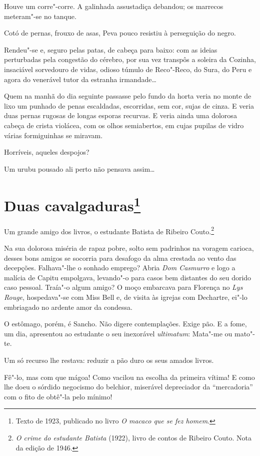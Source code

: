 Houve um corre"-corre. A galinhada assustadiça debandou; os marrecos
meteram"-se no tanque.

Cotó de pernas, frouxo de asas, Peva pouco resistiu à perseguição do
negro.

Rendeu"-se e, seguro pelas patas, de cabeça para baixo: com as ideias
perturbadas pela congestão do cérebro, por sua vez transpôs a soleira da
Cozinha, insaciável sorvedouro de vidas, odioso túmulo de Reco"-Reco, do
Sura, do Peru e agora do venerável tutor da estranha irmandade\ldots{}

Quem na manhã do dia seguinte passasse pelo fundo da horta veria no
monte de lixo um punhado de penas escaldadas, escorridas, sem cor, sujas
de cinza. E veria duas pernas rugosas de longas esporas recurvas. E
veria ainda uma dolorosa cabeça de crista violácea, com os olhos
semiabertos, em cujas pupilas de vidro várias formiguinhas se miravam.

Horríveis, aqueles despojos?

Um urubu pousado ali perto não pensava assim\ldots{}

\chapter{Duas cavalgaduras\footnote[*]{Texto de 1923, publicado no livro \emph{O macaco que se fez homem}.}}

Um grande amigo dos livros, o estudante Batista de Ribeiro
Couto.\footnote{\emph{O crime do estudante Batista} (1922), livro de
  contos de Ribeiro Couto. Nota da edição de 1946.}

Na sua dolorosa miséria de rapaz pobre, solto sem padrinhos na voragem
carioca, desses bons amigos se socorria para desafogo da alma crestada
ao vento das decepções. Falhava"-lhe o sonhado emprego? Abria \emph{Dom
Casmurro} e logo a malícia de Capitu empolgava, levando"-o para casos bem
distantes do seu dorido caso pessoal. Traía"-o algum amigo? O moço
embarcava para Florença no \emph{Lys Rouge}, hospedava"-se com Miss Bell
e, de visita às igrejas com Dechartre, ei"-lo embriagado no ardente amor
da condessa.

O estômago, porém, é Sancho. Não digere contemplações. Exige pão. E a
fome, um dia, apresentou ao estudante o seu inexorável \emph{ultimatum}:
Mata"-me ou mato"-te.

Um só recurso lhe restava: reduzir a pão duro os seus amados livros.

Fê"-lo, mas com que mágoa! Como vacilou na escolha da primeira vítima! E
como lhe doeu o sórdido negocismo do belchior, miserável depreciador da
``mercadoria'' com o fito de obtê"-la pelo mínimo!

